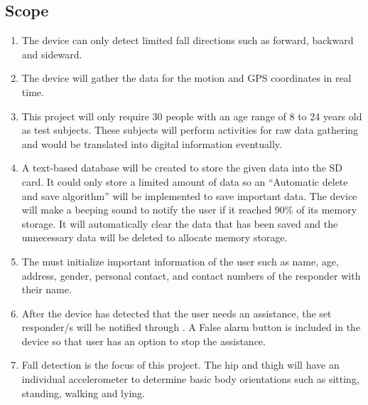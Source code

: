 \subsection{Scope}
\begin{enumerate}
	\item The device can only detect limited fall directions such as forward, backward and sideward.
	
	\item The device will gather the data for the motion and GPS coordinates in real time.
	
	\item This project will only require 30 people with an age range of 8 to 24 years old as test subjects. These subjects will perform activities for raw data gathering and would be translated into digital information eventually.
	
	\item A text-based database will be created to store the given data into the SD card. It could only store a limited amount of data so an “Automatic delete and save algorithm” will be implemented to save important data. The device will make a beeping sound to notify the user if it reached 90\% of its memory storage. It will automatically clear the data that has been saved and the unnecessary data will be deleted to allocate memory storage.
	
	\item The  must initialize important information of the user such as name, age, address, gender, personal contact, and contact numbers of the responder with their name.
	
	\item After the device has detected that the user needs an assistance, the set responder/s will be notified through . A False alarm button is included in the device so that user has an option to stop the assistance.
	
	\item Fall detection is the focus of this project. The hip and thigh will have an individual accelerometer to determine basic body orientations such as sitting, standing, walking and lying.
	
\end{enumerate}

